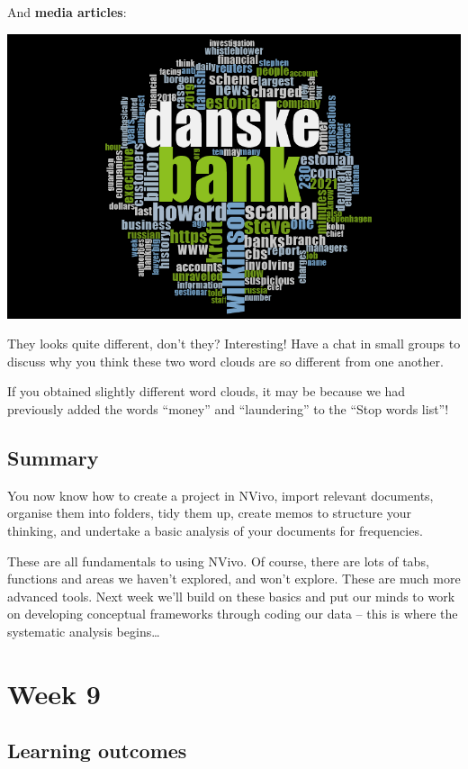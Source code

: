 \documentclass[
]{book}
\begin{document}
And \textbf{media articles}:

\includegraphics{imgs/cloud_media.png}

They looks quite different, don't they? Interesting! Have a chat in small groups to discuss why you think these two word clouds are so different from one another.

If you obtained slightly different word clouds, it may be because we had previously added the words ``money'' and ``laundering'' to the ``Stop words list''!

\hypertarget{summary-7}{%
\section{Summary}\label{summary-7}}

You now know how to create a project in NVivo, import relevant documents, organise them into folders, tidy them up, create memos to structure your thinking, and undertake a basic analysis of your documents for frequencies.

These are all fundamentals to using NVivo. Of course, there are lots of tabs, functions and areas we haven't explored, and won't explore. These are much more advanced tools.
Next week we'll build on these basics and put our minds to work on developing conceptual frameworks through coding our data -- this is where the systematic analysis begins\ldots{}

\hypertarget{week9}{%
\chapter{Week 9}\label{week9}}

\hypertarget{learning-outcomes-8}{%
\section{Learning outcomes}\label{learning-outcomes-8}}
\end{document}

